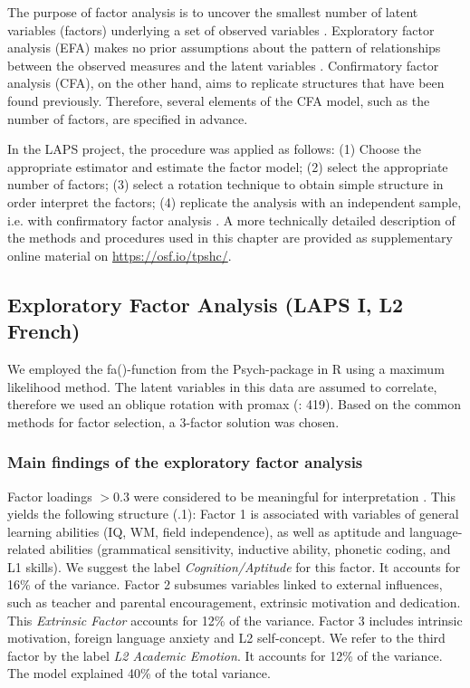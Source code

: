 \documentclass[output=paper]{langsci/langscibook}
\begin{document}
The purpose of factor analysis is to uncover the smallest number of latent variables (factors) underlying a set of observed variables \citep{Brown2006}. Exploratory factor analysis (EFA) makes no prior assumptions about the pattern of relationships between the observed measures and the latent variables \citep{Brown2006}. Confirmatory factor analysis (CFA), on the other hand, aims to replicate structures that have been found previously. Therefore, several elements of the CFA model, such as the number of factors, are specified in advance.

In the LAPS project, the procedure was applied as follows: (1) Choose the appropriate estimator and estimate the factor model; (2) select the appropriate number of factors; (3) select a rotation technique to obtain simple structure in order interpret the factors; (4) replicate the analysis with an independent sample, i.e. with confirmatory factor analysis \citep{Brown2006}. A more technically detailed description of the methods and procedures used in this chapter are provided as supplementary online material on \url{https://osf.io/tpshc/}.

\subsection{Exploratory Factor Analysis (LAPS I, L2 French)}

We employed the fa()-function from the Psych-package in R \citep{Revelle2018} using a maximum likelihood method. The latent variables in this data are assumed to correlate, therefore we used an oblique rotation with promax (\citealt{BortzSchuster2010}: 419). Based on the common methods for factor selection, a 3-factor solution was chosen. 

 \subsubsection{Main findings of the exploratory factor analysis}


Factor loadings $> 0.3$ were considered to be meaningful for interpretation \citep[30]{Brown2006}. This yields the following structure (.1): Factor 1 is associated with variables of general learning abilities (IQ, WM, field independence), as well as aptitude and language-related abilities (grammatical sensitivity, inductive ability, phonetic coding, and L1 skills). We suggest the label \textit{Cognition/Aptitude} for this factor. It accounts for 16\% of the variance. Factor 2 subsumes variables linked to external influences, such as teacher and parental encouragement, extrinsic motivation and dedication. This \textit{Extrinsic Factor} accounts for 12\% of the variance. Factor 3 includes intrinsic motivation, foreign language anxiety and L2 self-concept. We refer to the third factor by the label \textit{L2 Academic Emotion}. It accounts for 12\% of the variance. The model explained 40\% of the total variance. 
\end{document}
